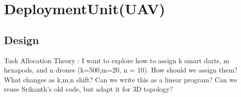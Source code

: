 \section{DeploymentUnit(UAV)}\label{sec:DeploymentUnit(UAV)}

\subsection{Design}
Task Allocation Theory : I want to explore how to assign k smart darts, m hexapods, and n drones  (k=500,m=20, n = 10).  
How should we assign them?  
What changes as k,m,n shift?
Can we write this as a linear program?
Can we reuse Srikanth’s old code, but adapt it for 3D topology?
